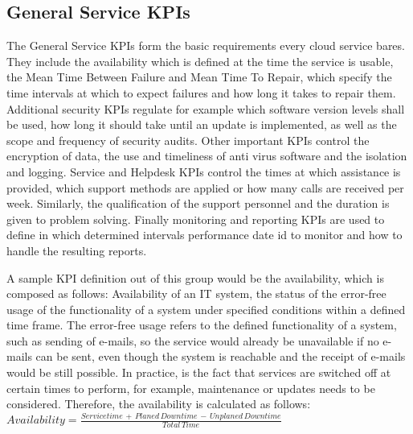 \subsection{General Service KPIs } 
 The General Service KPIs form the basic requirements every cloud service bares. They include the availability  which is defined at the time the service is usable, the  Mean Time Between Failure and Mean Time To Repair, which specify the time intervals at which to expect failures and how long it takes to repair them. Additional security KPIs regulate for example which software version levels shall be used, how long it should take until an update is implemented, as well as the scope and frequency of security audits. Other important KPIs control the encryption of data, the use and timeliness of anti virus software and the isolation and logging. Service and Helpdesk KPIs control the times at which assistance is provided, which support methods are applied or how many calls are received per week. Similarly, the qualification of the support personnel and the duration is given to problem solving. Finally monitoring and reporting KPIs are used to define in which determined intervals performance date id to monitor and how to handle the resulting reports. 
 
 A sample KPI definition out of this group would be the availability, which is composed as follows: Availability of an IT system, the status of the error-free usage of the functionality of a system under specified conditions within a defined time frame. The error-free usage refers to the defined functionality of a system, such as sending of e-mails, so the service would already be unavailable if no e-mails can be sent, even though the system is reachable and the receipt of e-mails would be still possible. In practice, is the fact that services are switched off at certain times to perform, for example, maintenance or updates needs to be considered. Therefore,  the availability is calculated  as follows:\\
 
  $ Availability =  \frac{Servicetime \,+ \,Planed\, Downtime\, - \,Unplaned \, Downtime}{Total  \, Time}$\\
 
